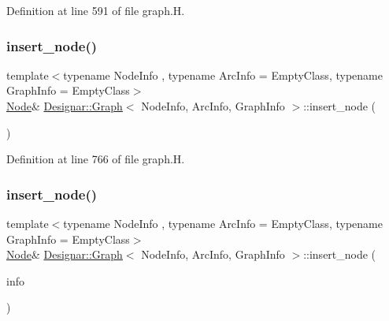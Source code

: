 Definition at line 591 of file graph.\+H.

\mbox{\label{class_designar_1_1_graph_a5da24cc7de9ae39b1df684cb75782fed}} 
\subsubsection{\texorpdfstring{insert\+\_\+node()}{insert\_node()}\hspace{0.1cm}{\footnotesize\ttfamily [2/4]}}
{\footnotesize\ttfamily template$<$typename Node\+Info , typename Arc\+Info  = Empty\+Class, typename Graph\+Info  = Empty\+Class$>$ \\
\hyperlink{class_designar_1_1_graph_a5dfc7dba9d092ac489c72e40390c37d0}{Node}\& \hyperlink{class_designar_1_1_graph}{Designar\+::\+Graph}$<$ Node\+Info, Arc\+Info, Graph\+Info $>$\+::insert\+\_\+node (\begin{DoxyParamCaption}{ }\end{DoxyParamCaption})\hspace{0.3cm}{\ttfamily [inline]}}



Definition at line 766 of file graph.\+H.

\mbox{\label{class_designar_1_1_graph_a573d7ab63075e30bc8c5aaa2a80548ec}} 
\subsubsection{\texorpdfstring{insert\+\_\+node()}{insert\_node()}\hspace{0.1cm}{\footnotesize\ttfamily [3/4]}}
{\footnotesize\ttfamily template$<$typename Node\+Info , typename Arc\+Info  = Empty\+Class, typename Graph\+Info  = Empty\+Class$>$ \\
\hyperlink{class_designar_1_1_graph_a5dfc7dba9d092ac489c72e40390c37d0}{Node}\& \hyperlink{class_designar_1_1_graph}{Designar\+::\+Graph}$<$ Node\+Info, Arc\+Info, Graph\+Info $>$\+::insert\+\_\+node (\begin{DoxyParamCaption}\item[{const Node\+Info \&}]{info }\end{DoxyParamCaption})\hspace{0.3cm}{\ttfamily [inline]}}



